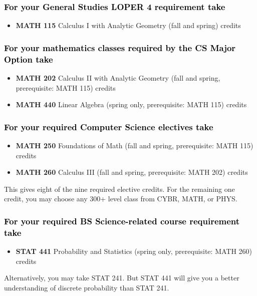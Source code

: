 \documentclass[10pt]{article}
\newenvironment{mypar}[2]
   {\begin{list}{}%
     {\setlength\leftmargin{#1}
     \setlength\rightmargin{#2}}
     \item[]}
   {\end{list}}
\newcommand{\calcone}{\textbf{MATH 115} Calculus I with Analytic Geometry (fall and spring) \dotfill 5 credits}
\newcommand{\calctwo}{\textbf{MATH 202} Calculus II with Analytic Geometry (fall and spring, prerequisite: MATH 115) \dotfill 5 credits }
\newcommand{\foundations}{\textbf{MATH 250} Foundations of Math (fall and spring, prerequisite: MATH 115)  \dotfill 3 credits}
\newcommand{\calcthree}{\textbf{MATH 260} Calculus III  (fall and spring, prerequisite: MATH 202) \dotfill 5 credits}
\newcommand{\linear}{\textbf{MATH 440} Linear Algebra (spring only, prerequisite: MATH 115) \dotfill 3 credits}
\newcommand{\statistics}{\textbf{STAT 441} Probability and Statistics (spring only, prerequisite: MATH 260)  \dotfill  3 credits}
\begin{document}
\subsubsection*{\textcolor{black}{For  your General Studies LOPER 4 requirement take}}
\begin{itemize}
\item  \calcone
\end{itemize}

\vspace{-0.1in}
\subsubsection*{\textcolor{black}{For your mathematics classes required by the CS Major Option take}}
\begin{itemize}
\item \calctwo
\item \linear
\end{itemize}

\vspace{-0.1in}
\subsubsection*{\textcolor{black}{For your required Computer Science electives take}}

\begin{itemize}
\item \foundations
\item \calcthree
\end{itemize}
\vspace{-0.1in}
\begin{mypar}{0.5cm}{0.5cm} This gives eight of the nine required elective credits. For the remaining one credit, you may choose any 300+ level class from CYBR,  MATH, or PHYS.
\end{mypar}
\vspace{-0.2in}
\subsubsection*{\textcolor{black}{For your required BS Science-related course requirement take}}
\begin{itemize}
\item \statistics
\end{itemize}
\vspace{-0.1in}
\begin{mypar}{0.5cm}{0.5cm}Alternatively, you may take STAT 241. But STAT 441 will give you  a  better understanding of discrete probability than STAT 241.
\end{mypar}
\vspace{-0.1in}
\end{document}

